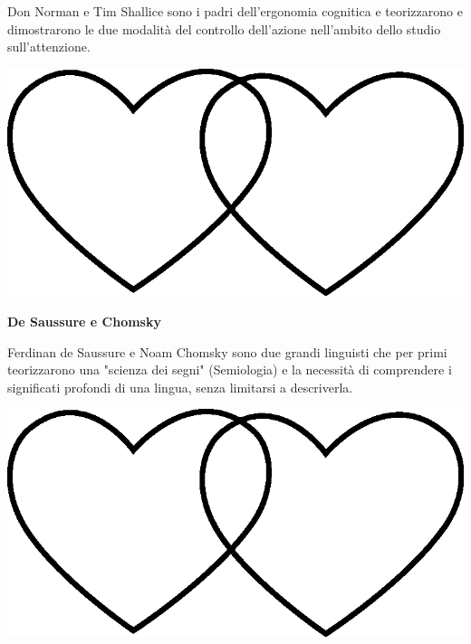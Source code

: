 \documentclass[11pt]{extarticle}
\begin{document}
\newpage
{}
\vspace*{\fill}
\begin{center}
Don Norman e Tim Shallice sono i padri dell'ergonomia cognitica e teorizzarono e dimostrarono le due modalità del controllo dell'azione nell'ambito dello studio sull'attenzione.\\
\begin{center}
\includegraphics[scale=0.1]{img/cuori_venn.eps}\\
\end{center}
\end{center}
\vspace*{\fill}
\newpage
\begin{center}
\vspace*{\fill}
{\Huge \textbf{De Saussure e Chomsky\\}}
\vspace*{\fill}
\end{center}
\newpage
{}
\vspace*{\fill}
\begin{center}
Ferdinan de Saussure e Noam Chomsky sono due grandi linguisti che per primi teorizzarono una "scienza dei segni" (Semiologia) e la necessità di comprendere i significati profondi di una lingua, senza limitarsi a descriverla.\\
\begin{center}
\includegraphics[scale=0.1]{img/cuori_venn.eps}\\
\end{center}
\end{center}
\end{document}
